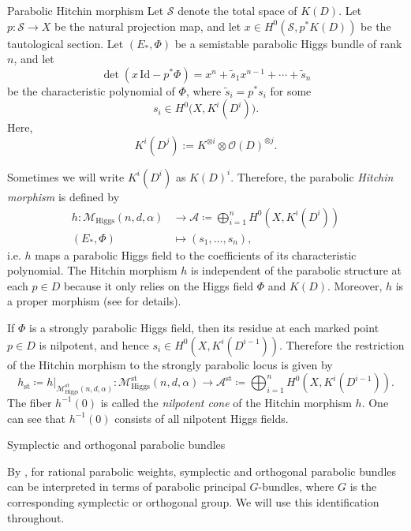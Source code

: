 \documentclass[11pt, reqno]{amsart}
\makeatletter
\numberwithin{equation}{section}
\def\subsection{\@startsection{subsection}{2}%
  \normalparindent{.5\linespacing\@plus.7\linespacing}{-.5em}%
  {\normalfont\bfseries}}
\def\subsubsection{\@startsection{subsubsection}{3}%
  \normalparindent\z@{-.5em}%
  {\normalfont\itshape}}
\theoremstyle{definition}
\makeatother
\begin{document}
\subsubsection{Parabolic Hitchin morphism}
Let $\mathcal{S}$ denote the total space of $K(D)$. Let $p: \mathcal{S} \to X $ be the natural projection map, and let $x \in H^0(\mathcal{S}, p^*K(D))$ be the tautological section. Let $(E_*,\Phi)$ be a semistable parabolic Higgs bundle of rank $n$, and let
\[
\det(x\,\mathrm{Id} - p^*\Phi) = x^n + \tilde{s}_1 x^{n-1} + \cdots + \tilde{s}_n
\]
be the characteristic polynomial of $\Phi$, where $\tilde{s}_i = p^* s_i$ for some
\[
s_i \in H^0\bigl(X, K^i(D^i)\bigr).
\]
Here,
\[
K^i(D^j) := K^{\otimes i} \otimes \mathcal{O}(D)^{\otimes j}.
\]

Sometimes we will write $K^i(D^i)$ as $K(D)^i$. Therefore, the parabolic \textit{Hitchin morphism} is defined by
\begin{align*}
h :\mathcal{M}_{\mathrm{Higgs}}(n,d,\alpha) &\longrightarrow \label{key}\mathcal{A} \coloneqq \bigoplus_{i=1}^n H^0(X, K^i(D^{i}))  \\
(E_*,\Phi) &\longmapsto (s_1,\dots,s_n),
\end{align*}
i.e. $h$ maps a parabolic Higgs field to the coefficients of its characteristic polynomial. The Hitchin morphism $h$ is independent of the parabolic structure at each $p\in D$ because it only relies on the Higgs field $\Phi$ and $K(D)$. Moreover, $h$ is a proper morphism (see \cite{M94} for details). 

If $\Phi$ is a strongly parabolic Higgs field, then its residue at each marked point $p \in D$ is nilpotent, and hence $s_i \in H^0(X, K^i(D^{i-1}))$. Therefore the restriction of the Hitchin morphism to the strongly parabolic locus is given by
\[
h_{\mathrm{st}} \coloneqq \left.h\right|_{\mathcal{M}^{\mathrm{st}}_{\mathrm{Higgs}}(n,d,\alpha)} :\mathcal{M}^{\mathrm{st}}_{\mathrm{Higgs}}(n,d,\alpha) \longrightarrow \label{key}\mathcal{A}^{\mathrm{st}} \coloneqq \bigoplus_{i=1}^n H^0(X, K^i(D^{i-1})).
\]
The fiber $h^{-1}(0)$ is called the \textit{nilpotent cone} of the Hitchin morphism $h$. One can see that $h^{-1}(0)$ consists of all nilpotent Higgs fields. 

\subsection{Symplectic and orthogonal parabolic bundles}

By \cite{BMW11}, for rational parabolic weights, symplectic and orthogonal parabolic bundles can be interpreted in terms of parabolic principal $G$-bundles, where $G$ is the corresponding symplectic or orthogonal group. We will use this identification throughout.
\end{document}
